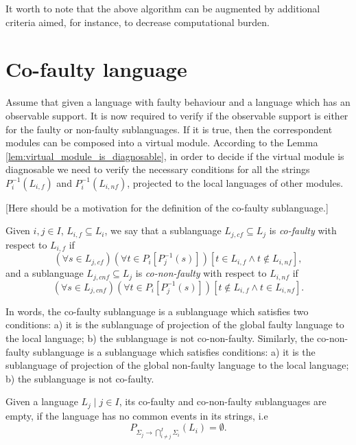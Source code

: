 \documentclass[a4paper, 10pt, conference]{ieeeconf}
\begin{document}
It worth to note that the above algorithm can be augmented by additional
criteria aimed, for instance, to decrease computational burden.


\section{Co-faulty language}

Assume that given a language with faulty behaviour and a language which has an
observable support. It is now required to verify if the observable support is
either for the faulty or non-faulty sublanguages. If it is true, then the
correspondent modules can be composed into a virtual module.
According to the Lemma \ref{lem:virtual_module_is_diagnosable}, in order to
decide if the virtual module is diagnosable we need to verify the necessary
conditions for all the strings $P_i^{-1}(L_{i,f})$ and $P_i^{-1}(L_{i,nf})$,
projected to the local languages of other modules.

[Here should be a motivation for the definition of the co-faulty sublanguage.]

\begin{definition}
\label{def:co-faulty}
Given $i, j \in I$, $L_{i,f} \subseteq L_i$,
we say that a sublanguage $L_{j,cf} \subseteq L_j$ is \emph{co-faulty} with
respect to $L_{i,f}$ if 
$$
	(\forall s \in L_{j,cf})(\forall t \in P_i[P_j^{-1}(s)])
	\left[
		t \in L_{i,f} \land t \not \in L_{i,nf}   
	\right],
$$ 
and a sublanguage $L_{j,cnf} \subseteq L_j$ is
\emph{co-non-faulty} with respect to $L_{i,nf}$ if 
$$
	(\forall s \in L_{j,cnf})(\forall t \in P_i[P_j^{-1}(s)])
	\left[
		t \not \in L_{i,f} \land t \in L_{i,nf}   
	\right].
$$ 
\end{definition}

In words, the co-faulty sublanguage is a sublanguage which satisfies two
conditions:
a) it is the sublanguage of projection of the global faulty language
to the local language; b) the sublanguage is not co-non-faulty.
Similarly, the co-non-faulty sublanguage is a sublanguage which satisfies
conditions:
a) it is the sublanguage of projection of the global non-faulty language
to the local language; b) the sublanguage is not co-faulty.

\begin{lemma}
\label{lem:empty_co_if_no_common}  
Given a language $L_j\mid j \in I$, its co-faulty and
co-non-faulty sublanguages are empty, if the language has no common events in
its strings, i.e
$$P_{\Sigma_j \rightarrow \bigcap_{i\neq j}^I \Sigma_i}(L_i) = \emptyset.$$
\end{lemma}
\end{document}
